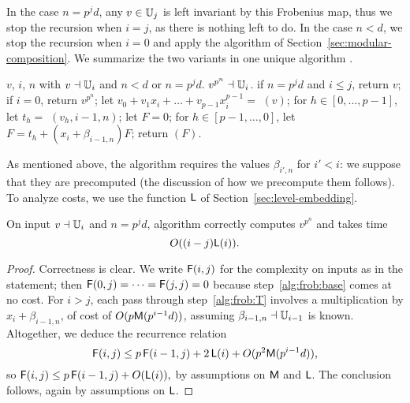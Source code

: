 In the case $n=p^jd$, any $v \in \mathbb{U}_j$ is left invariant by this
Frobenius map, thus we stop the recursion when $i=j$, as there is
nothing left to do. In the case $n<d$, we stop the recursion when
$i=0$ and apply the algorithm of
Section~\ref{sec:modular-composition}. We summarize the two variants
in one unique algorithm
.

\begin{algorithm}
  \caption{}
  \label{alg:iterfrobenius}
  \begin{algorithmic}[1]
    \REQUIRE $v$, $i$, $n$ with $v\dashv\mathbb{U}_i$ and $n<d$ or $n=p^jd$.
    \ENSURE $v^{p^n} \dashv \mathbb{U}_i$.
    \STATE \label{alg:frob:base} if $n=p^jd$ and $i \le j$, return $v$;
    \STATE \label{alg:frob:base2} if $i=0$, return $v^{p^n}$;
    \STATE \label{alg:frob:push} let $v_0 + v_1 x_i + \dots + v_{p-1} x_i^{p-1}=$ $(v)$;
    \STATE \label{alg:frob:rec} for $h \in [0,\dots,p-1]$, let $t_h =$ $(v_h, i-1, n)$;
    \STATE let $F=0$;
    \STATE\label{alg:frob:T} for $h \in [p-1,\dots,0]$, let $F = t_h +  (x_i+\beta_{i-1,n})F$;
    \STATE \label{alg:frob:lift} return $(F)$.
  \end{algorithmic}
\end{algorithm}

As mentioned above, the algorithm requires the values $\beta_{i',n}$
for $i'<i$: we suppose that they are precomputed (the discussion of
how we precompute them follows).  To analyze costs, we use the
function $\mathsf{L}$ of Section~\ref{sec:level-embedding}.
\begin{theorem}
  \label{th:b-ifrob}
  On input $v\dashv\mathbb{U}_i$ and $n=p^jd$, algorithm 
  correctly computes $v^{p^n}$ and takes time
  \begin{equation}
    \label{eq:95}
    O((i-j)\mathsf{L}(i))
    \text{.}
  \end{equation}
\end{theorem}
\begin{proof}
  Correctness is clear. We write $\mathsf{F}(i,j)$ for the complexity on
  inputs as in the statement; then $\mathsf{F}(0,j)=\cdots=\mathsf{F}(j,j)=0$
  because step~\ref{alg:frob:base} comes at no cost. For $i>j$, each
  pass through step~\ref{alg:frob:T} involves a multiplication by
  $x_i+\beta_{i-1,n}$, of cost of $O(p\mathsf{M}(p^{i-1}d))$, assuming
  $\beta_{i-1,n}\dashv \mathbb{U}_{i-1}$ is known. Altogether, we deduce the
  recurrence relation
  \begin{equation}
    \mathsf{F}(i,j) \le
    p\,\mathsf{F}(i-1,j)+2\,\mathsf{L}(i)+O(p^2\mathsf{M}(p^{i-1}d))
    \text{,}
  \end{equation}
  so $\mathsf{F}(i,j) \le p\,\mathsf{F}(i-1,j)+O(\mathsf{L}(i)),$ by assumptions on
  $\mathsf{M}$ and $\mathsf{L}$.  The conclusion follows, again by assumptions
  on $\mathsf{L}$.
\end{proof}

